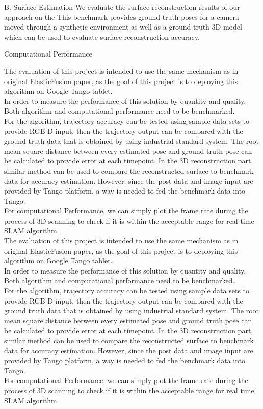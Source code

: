 \documentclass[12pt,twoside]{article}
\begin{document}
B. Surface Estimation
We evaluate the surface reconstruction results of our approach
on the
 This
benchmark provides ground truth poses for a camera moved
through a synthetic environment as well as a ground truth 3D
model which can be used to evaluate surface reconstruction
accuracy.

Computational Performance


​The evaluation of this project is intended to use the same mechanism as in original ElasticFusion\citep{whelan2016elasticfusion} paper, as the goal of this project is to deploying this algorithm on Google Tango tablet.\\
In order to measure the performance of this solution by quantity and quality. Both algorithm and computational performance need to be benchmarked.\\
For the algorithm, trajectory accuracy can be tested using sample data sets to provide RGB-D input, then the trajectory output can be compared with the ground truth data that is obtained by using industrial standard system. The root mean square distance between every estimated pose and ground truth pose can be calculated to provide error at each timepoint. In the 3D reconstruction part, similar method can be used to compare the reconstructed surface to benchmark data for accuracy estimation. However, since the post data and image input are provided by Tango platform, a way is needed to fed the benchmark data into Tango.\\
For computational Performance, we can simply plot the frame rate during the process of 3D scanning to check if it is within the acceptable range for real time SLAM algorithm.\\
​The evaluation of this project is intended to use the same mechanism as in original ElasticFusion\citep{whelan2016elasticfusion} paper, as the goal of this project is to deploying this algorithm on Google Tango tablet.\\
In order to measure the performance of this solution by quantity and quality. Both algorithm and computational performance need to be benchmarked.\\
For the algorithm, trajectory accuracy can be tested using sample data sets to provide RGB-D input, then the trajectory output can be compared with the ground truth data that is obtained by using industrial standard system. The root mean square distance between every estimated pose and ground truth pose can be calculated to provide error at each timepoint. In the 3D reconstruction part, similar method can be used to compare the reconstructed surface to benchmark data for accuracy estimation. However, since the post data and image input are provided by Tango platform, a way is needed to fed the benchmark data into Tango.\\
For computational Performance, we can simply plot the frame rate during the process of 3D scanning to check if it is within the acceptable range for real time SLAM algorithm.
\end{document}
